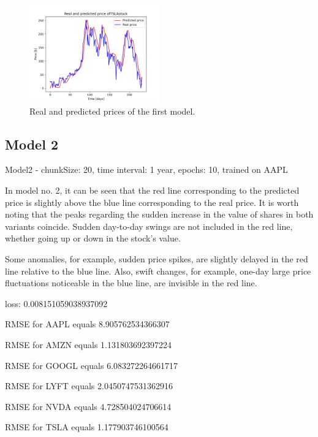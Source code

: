 \begin{figure}
\includegraphics[width=0.5\textwidth]{./graf/model1/TSLA.png}
\caption{Real and predicted prices of the first model.}
\label{fig:label}
\end{figure} 

\clearpage
\subsection{Model 2}

Model2 - chunkSize: 20, time interval: 1 year, epochs: 10, trained on AAPL\par\bigskip
In model no. 2, it can be seen that the red line corresponding to the predicted price is slightly above
the blue line corresponding to the real price. It is worth noting that the peaks regarding the sudden
increase in the value of shares in both variants coincide. Sudden day-to-day swings are not included
in the red line, whether going up or down in the stock's value.
\par
Some anomalies, for example, sudden price spikes, are slightly delayed in the red line relative to the blue line.
Also, swift changes, for example, one-day large price fluctuations noticeable in the blue line, are invisible
in the red line.
\par\bigskip
loss: 0.008151059038937092\par
RMSE for AAPL equals 8.905762534366307\par
RMSE for AMZN equals 1.131803692397224\par
RMSE for GOOGL equals 6.083272264661717\par
RMSE for LYFT equals 2.0450747531362916\par
RMSE for NVDA equals 4.728504024706614\par
RMSE for TSLA equals 1.177903746100564\par


